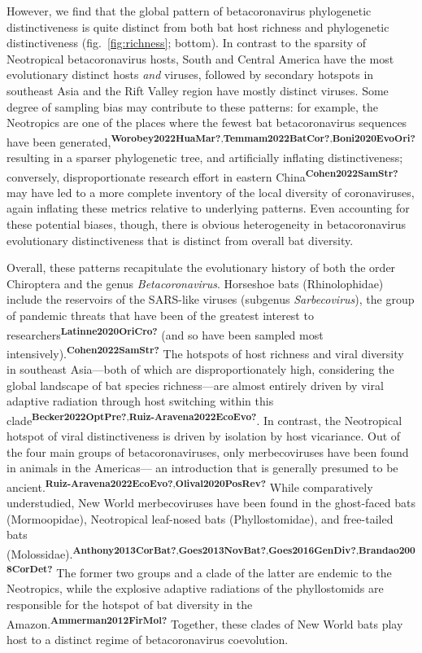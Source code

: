 \documentclass[10pt,oneside]{article}
\begin{document}
However, we find that the global pattern of betacoronavirus phylogenetic
distinctiveness is quite distinct from both bat host richness and
phylogenetic distinctiveness (fig.~\ref{fig:richness}; bottom). In
contrast to the sparsity of Neotropical betacoronavirus hosts, South and
Central America have the most evolutionary distinct hosts \emph{and}
viruses, followed by secondary hotspots in southeast Asia and the Rift
Valley region have mostly distinct viruses. Some degree of sampling bias
may contribute to these patterns: for example, the Neotropics are one of
the places where the fewest bat betacoronavirus sequences have been
generated,\textsuperscript{\textbf{Worobey2022HuaMar?},\textbf{Temmam2022BatCor?},\textbf{Boni2020EvoOri?}}
resulting in a sparser phylogenetic tree, and artificially inflating
distinctiveness; conversely, disproportionate research effort in eastern
China\textsuperscript{\textbf{Cohen2022SamStr?}} may have led to a more
complete inventory of the local diversity of coronaviruses, again
inflating these metrics relative to underlying patterns. Even accounting
for these potential biases, though, there is obvious heterogeneity in
betacoronavirus evolutionary distinctiveness that is distinct from
overall bat diversity.

Overall, these patterns recapitulate the evolutionary history of both
the order Chiroptera and the genus \emph{Betacoronavirus}. Horseshoe
bats (Rhinolophidae) include the reservoirs of the SARS-like viruses
(subgenus \emph{Sarbecovirus}), the group of pandemic threats that have
been of the greatest interest to
researchers\textsuperscript{\textbf{Latinne2020OriCro?}} (and so have
been sampled most
intensively).\textsuperscript{\textbf{Cohen2022SamStr?}} The hotspots of
host richness and viral diversity in southeast Asia---both of which are
disproportionately high, considering the global landscape of bat species
richness---are almost entirely driven by viral adaptive radiation
through host switching within this
clade\textsuperscript{\textbf{Becker2022OptPre?},\textbf{Ruiz-Aravena2022EcoEvo?}}.
In contrast, the Neotropical hotspot of viral distinctiveness is driven
by isolation by host vicariance. Out of the four main groups of
betacoronaviruses, only merbecoviruses have been found in animals in the
Americas--- an introduction that is generally presumed to be
ancient.\textsuperscript{\textbf{Ruiz-Aravena2022EcoEvo?},\textbf{Olival2020PosRev?}}
While comparatively understudied, New World merbecoviruses have been
found in the ghost-faced bats (Mormoopidae), Neotropical leaf-nosed bats
(Phyllostomidae), and free-tailed bats
(Molossidae).\textsuperscript{\textbf{Anthony2013CorBat?},\textbf{Goes2013NovBat?},\textbf{Goes2016GenDiv?},\textbf{Brandao2008CorDet?}}
The former two groups and a clade of the latter are endemic to the
Neotropics, while the explosive adaptive radiations of the phyllostomids
are responsible for the hotspot of bat diversity in the
Amazon.\textsuperscript{\textbf{Ammerman2012FirMol?}} Together, these
clades of New World bats play host to a distinct regime of
betacoronavirus coevolution.
\end{document}

